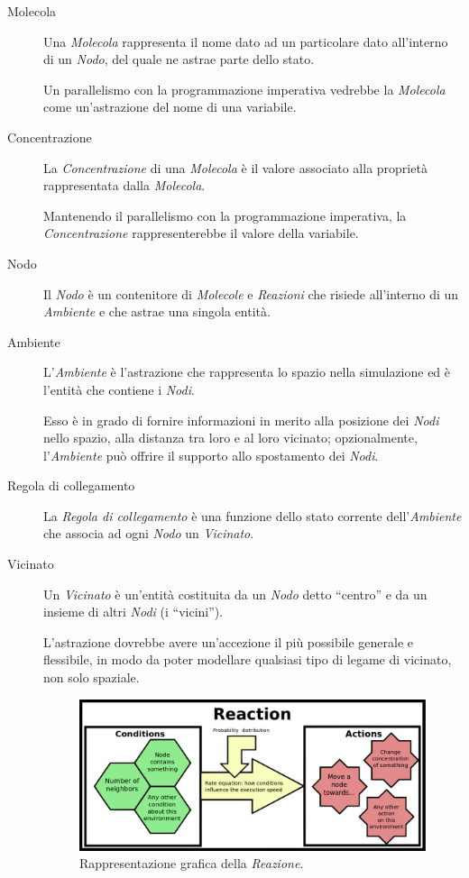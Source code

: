     \begin{description}
      \item[Molecola]\label{itm:mol}
        Una \emph{Molecola} rappresenta il nome dato ad un particolare dato all'interno di un \emph{Nodo}, del quale ne astrae parte dello stato.

        Un parallelismo con la programmazione imperativa vedrebbe la \emph{Molecola} come un'astrazione del nome di una variabile.

      \item[Concentrazione]\label{itm:conc}
        La \emph{Concentrazione} di una \emph{Molecola} è il valore associato alla proprietà rappresentata dalla \emph{Molecola}.

        Mantenendo il parallelismo con la programmazione imperativa, la \emph{Concentrazione} rappresenterebbe il valore della variabile.

      \item[Nodo]\label{itm:node}
        Il \emph{Nodo} è un contenitore di \emph{Molecole} e \emph{Reazioni} che risiede all'interno di un \emph{Ambiente} e che astrae una singola entità.

      \item[Ambiente]\label{itm:env}
        L'\emph{Ambiente} è l'astrazione che rappresenta lo spazio nella simulazione ed è l'entità che contiene i \emph{Nodi}.

        Esso è in grado di fornire informazioni in merito alla posizione dei \emph{Nodi} nello spazio, alla distanza tra loro e al loro vicinato;
        opzionalmente, l'\emph{Ambiente} può offrire il supporto allo spostamento dei \emph{Nodi}.

      \item[Regola di collegamento]\label{itm:linkr}
        La \emph{Regola di collegamento} è una funzione dello stato corrente dell'\emph{Ambiente} che associa ad ogni \emph{Nodo} un \emph{Vicinato}.

      \item[Vicinato]\label{itm:neigh}
        Un \emph{Vicinato} è un'entità costituita da un \emph{Nodo} detto ``centro'' e da un insieme di altri \emph{Nodi} (i ``vicini'').

        L'astrazione dovrebbe avere un'accezione il più possibile generale e flessibile, in modo da poter modellare qualsiasi tipo di legame di vicinato, non solo spaziale.

        \begin{figure}[htbp]
          \centering
          \includegraphics[width=.85\textwidth]{res/fig/alchemist_reaction.png}
          \caption{Rappresentazione grafica della \emph{Reazione}.}%
          \label{fig:alchemist:reaction}
        \end{figure}


\end{description}
